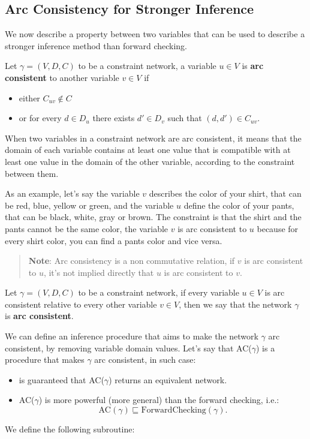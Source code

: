 \documentclass[10pt, letterpaper]{report}
\begin{document}
\subsection{Arc Consistency for Stronger Inference}
We now describe a property between two variables that can be used to describe a stronger inference method than forward checking.\begin{definition}
    Let $\gamma=(V,D,C)$ to be a constraint network, a variable $u\in V$ is \textbf{arc consistent} to another variable $v\in V$ if \begin{itemize}
            \item either $C_{uv}\notin  C$ 
            \item or for every $d\in D_u$ there exists $d'\in D_v$ such that $(d,d')\in C_{uv}$.
    \end{itemize}
\end{definition}
When two variables in a constraint network are arc consistent, it means that the domain  of each variable contains at least one value that is compatible with at least one value in the domain of the other variable, according to the constraint between them.

As an example, let's say the variable $v$ describes the color of your shirt, that can be red, blue, yellow or green, and the variable $u$ define the color of your pants, that can be black, white, gray or brown. The constraint is that the shirt and the pants cannot be the same color, the variable $v$ is  arc consistent to $u$ because for every shirt color, you can find a pants color and vice versa.\begin{quote}
    \textbf{Note}: Arc consistency is a non commutative relation, if $v$ is  arc consistent to $u$, it's not implied directly that $u$ is  arc consistent to $v$.
\end{quote}
\begin{definition}
    Let $\gamma=(V,D,C)$ to be a constraint network, if every variable $u\in V$ is arc consistent relative to every other variable $v\in V$, then we say that the network $\gamma$ is \textbf{arc consistent}.
\end{definition}
We can define an inference procedure that aims to make the network $\gamma$ arc consistent, by removing variable domain values. Let's say that AC($\gamma$) is a procedure that makes $\gamma$ arc consistent, in such case:\begin{itemize}
    \item is guaranteed that AC($\gamma$) returns an equivalent network.
    \item AC($\gamma$) is more powerful (more general) than the forward checking, i.e.:\begin{equation}
        \text{AC}(\gamma)\sqsubseteq \text{ForwardChecking}(\gamma).
    \end{equation}
\end{itemize}
We define the following subroutine:
\end{document}
